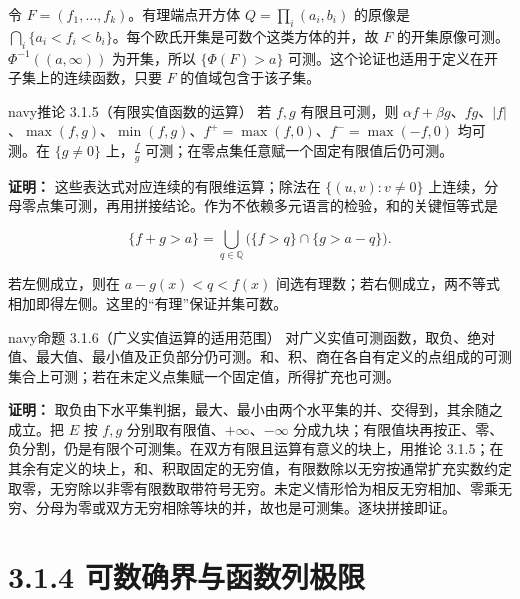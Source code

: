 \documentclass[11pt,a4paper]{article}
\begin{document}
令 \(F=(f_1,\ldots,f_k)\)。有理端点开方体 \(Q=\prod_i(a_i,b_i)\)
的原像是
\(\bigcap_i\{a_i<f_i<b_i\}\)。每个欧氏开集是可数个这类方体的并，故 \(F\)
的开集原像可测。\(\Phi^{-1}((a,\infty))\) 为开集，所以 \(\{\Phi(F)>a\}\)
可测。这个论证也适用于定义在开子集上的连续函数，只要 \(F\)
的值域包含于该子集。

\begin{sboxenv}{navy}{推论 3.1.5（有限实值函数的运算）}
若 \(f,g\) 有限且可测，则
\(\alpha f+\beta g\)、\(fg\)、\(|f|\)、\(\max(f,g)\)、\(\min(f,g)\)、\(f^+=\max(f,0)\)、\(f^-=\max(-f,0)\)
均可测。在 \(\{g\ne0\}\) 上，\(\frac{f}{g}\)
可测；在零点集任意赋一个固定有限值后仍可测。

\end{sboxenv}

\textbf{证明：} 这些表达式对应连续的有限维运算；除法在
\(\{(u,v):v\ne0\}\)
上连续，分母零点集可测，再用拼接结论。作为不依赖多元语言的检验，和的关键恒等式是

\begin{equation*}
\{f+g>a\}=\bigcup_{q\in\mathbb Q}\bigl(\{f>q\}\cap\{g>a-q\}\bigr).
\tag{3.1.3}
\end{equation*}

若左侧成立，则在 \(a-g(x)<q<f(x)\)
间选有理数；若右侧成立，两不等式相加即得左侧。这里的``有理''保证并集可数。

\begin{sboxenv}{navy}{命题 3.1.6（广义实值运算的适用范围）}
对广义实值可测函数，取负、绝对值、最大值、最小值及正负部分仍可测。和、积、商在各自有定义的点组成的可测集合上可测；若在未定义点集赋一个固定值，所得扩充也可测。

\end{sboxenv}

\textbf{证明：}
取负由下水平集判据，最大、最小由两个水平集的并、交得到，其余随之成立。把
\(E\) 按 \(f,g\) 分别取有限值、\(+\infty\)、\(-\infty\)
分成九块；有限值块再按正、零、负分割，仍是有限个可测集。在双方有限且运算有意义的块上，用推论
3.1.5；在其余有定义的块上，和、积取固定的无穷值，有限数除以无穷按通常扩充实数约定取零，无穷除以非零有限数取带符号无穷。未定义情形恰为相反无穷相加、零乘无穷、分母为零或双方无穷相除等块的并，故也是可测集。逐块拼接即证。

\section[\S{}3.1.4
可数确界与函数列极限]{3.1.4
可数确界与函数列极限}\label{ux53efux6570ux786eux754cux4e0eux51fdux6570ux5217ux6781ux9650}
\end{document}
